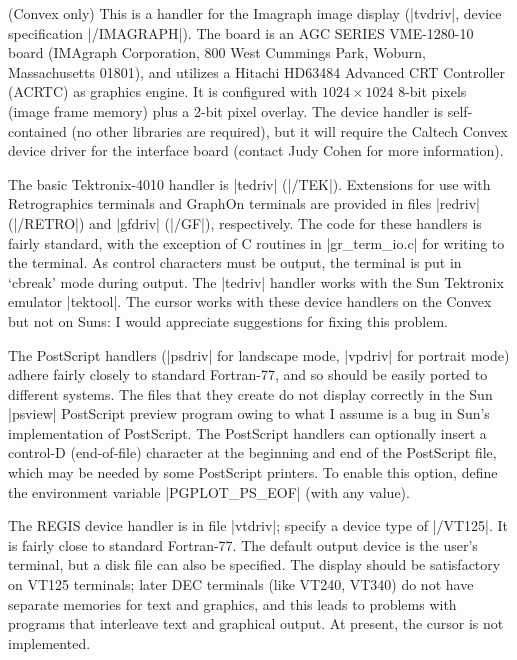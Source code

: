 (Convex only)
This is a handler for the Imagraph image display (|tvdriv|, device
specification |/IMAGRAPH|). The board is an AGC SERIES VME-1280-10 board
(IMAgraph Corporation, 800 West Cummings Park, Woburn, Massachusetts
01801), and utilizes a Hitachi HD63484 Advanced CRT Controller (ACRTC)
as graphics engine. It is configured with $1024 \times 1024$ 8-bit pixels
(image frame memory) plus a 2-bit pixel overlay. The device handler is
self-contained (no other libraries are required), but it will require
the Caltech Convex device driver for the interface board
(contact Judy Cohen for more information). 

The basic Tektronix-4010 handler is |tedriv| (|/TEK|). Extensions for
use with Retrographics terminals and Graph\-On terminals are provided in
files |redriv| (|/RETRO|) and |gfdriv| (|/GF|), respectively. The code for
these handlers is fairly standard, with the exception of C routines in
|gr_term_io.c| for writing to the terminal. As control characters must
be output, the terminal is put in `cbreak' mode during output.  The
|tedriv| handler works with the Sun Tektronix emulator |tektool|. The 
cursor works with these device handlers on the Convex but not on Suns:
I would appreciate suggestions for fixing this problem.

The PostScript handlers (|psdriv| for landscape mode, |vpdriv| for 
portrait mode) adhere fairly closely to standard Fortran-77, and so 
should be easily ported to different systems.
The files that they create do not display correctly in the Sun
|psview| PostScript preview program owing to what I assume is a bug in
Sun's implementation of PostScript. The PostScript handlers can 
optionally insert a control-D (end-of-file) character at the beginning
and end of the PostScript file, which may be needed by some PostScript 
printers. To enable this option, define the environment variable
|PGPLOT_PS_EOF| (with any value).

The REGIS device handler is in file |vtdriv|; specify a device type
of |/VT125|.  It is fairly close to standard Fortran-77. The default
output device is the user's terminal, but a disk file can also be 
specified. The display should be satisfactory on VT125 terminals; later
DEC terminals (like VT240, VT340) do not have separate memories for text
and graphics, and this leads to problems with programs that interleave
text and graphical output. At present, the cursor is not implemented. 

